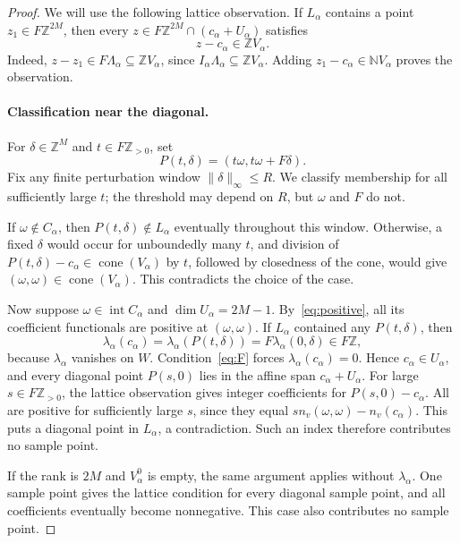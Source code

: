 \documentclass[a4paper,USenglish,cleveref,autoref]{lipics-v2021}
\newcommand{\N}{\mathbb N}
\newcommand{\Z}{\mathbb Z}
\newcommand{\cone}{\operatorname{cone}}
\begin{document}
\begin{proof}
We will use the following lattice observation.
If $L_\alpha$ contains a point $z_1\in F\Z^{2M}$, then every
$z\in F\Z^{2M}\cap(c_\alpha+U_\alpha)$ satisfies
\begin{equation}\label{eq:lattice}
 z-c_\alpha\in\Z V_\alpha.
\end{equation}
Indeed, $z-z_1\in F\Lambda_\alpha\subseteq\Z V_\alpha$, since $I_\alpha\Lambda_\alpha\subseteq\Z V_\alpha$.
Adding $z_1-c_\alpha\in\N V_\alpha$ proves the observation.

\paragraph{Classification near the diagonal.}
For $\delta\in\Z^M$ and $t\in F\Z_{>0}$, set
\begin{equation}\label{eq:P}
 P(t,\delta)=(t\omega,t\omega+F\delta).
\end{equation}
Fix any finite perturbation window $\|\delta\|_\infty\leq R$.
We classify membership for all sufficiently large $t$; the threshold may depend on $R$, but $\omega$ and $F$ do not.

If $\omega\notin C_\alpha$, then $P(t,\delta)\notin L_\alpha$ eventually throughout this window.
Otherwise, a fixed $\delta$ would occur for unboundedly many $t$, and division of $P(t,\delta)-c_\alpha\in\cone(V_\alpha)$ by $t$, followed by closedness of the cone, would give $(\omega,\omega)\in\cone(V_\alpha)$.
This contradicts the choice of the case.

Now suppose $\omega\in\operatorname{int}C_\alpha$ and $\dim U_\alpha=2M-1$.
By~\eqref{eq:positive}, all its coefficient functionals are positive at $(\omega,\omega)$.
If $L_\alpha$ contained any $P(t,\delta)$, then
\[
 \lambda_\alpha(c_\alpha)
 =\lambda_\alpha(P(t,\delta))
 =F\lambda_\alpha(0,\delta)\in F\Z,
\]
because $\lambda_\alpha$ vanishes on $W$.
Condition~\eqref{eq:F} forces $\lambda_\alpha(c_\alpha)=0$.
Hence $c_\alpha\in U_\alpha$, and every diagonal point $P(s,0)$ lies in the affine span $c_\alpha+U_\alpha$.
For large $s\in F\Z_{>0}$, the lattice observation gives integer coefficients for $P(s,0)-c_\alpha$.
All are positive for sufficiently large $s$, since they equal
$s n_v(\omega,\omega)-n_v(c_\alpha)$.
This puts a diagonal point in $L_\alpha$, a contradiction.
Such an index therefore contributes no sample point.

If the rank is $2M$ and $V_\alpha^0$ is empty, the same argument applies without $\lambda_\alpha$.
One sample point gives the lattice condition for every diagonal sample point, and all coefficients eventually become nonnegative.
This case also contributes no sample point.


\end{proof}
\end{document}
